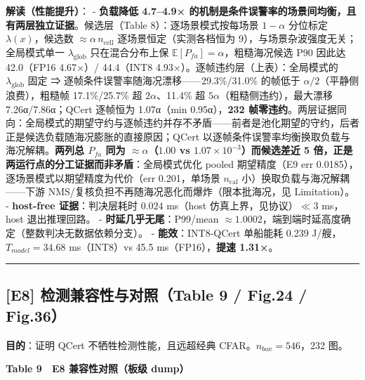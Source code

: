 \textbf{解读（性能提升）}： - \textbf{负载降低 4.7--4.9×
的机制是条件误警率的场景间均衡，且有两层独立证据}。候选层（Table
8）：逐场景模式按每场景 \(1-\alpha\) 分位标定 \(\lambda(x)\)，候选数
\(\approx\alpha\,n_{\mathrm{cell}}\) 逐场景恒定（实测各档恒为
9），与场景杂波强度无关；全局模式单一 \(\lambda_{\mathrm{glob}}\)
只在混合分布上保 \(\mathbb{E}[P_{fa}]=\alpha\)，粗糙海况候选 P90 因此达
42.0（FP16 4.67×）/ 44.4（INT8 4.93×）。逐帧违约层（上表）：全局模式的
\(\lambda_{\mathrm{glob}}\) 固定 ⇒
逐帧条件误警率随海况漂移------29.3\%/31.0\% 的帧低于
\(\alpha/2\)（平静侧浪费），粗糙帧 17.1\%/25.7\% 超 \(2\alpha\)、11.4\%
超 \(5\alpha\)（粗糙侧违约），最大漂移 7.26α/7.86α；QCert 逐帧恒为
1.07α（min 0.95α），\textbf{232
帧零违约}。两层证据同向：全局模式的期望守约与逐帧违约并存不矛盾------前者是池化期望的守约，后者正是候选负载随海况膨胀的直接原因；QCert
以逐帧条件误警率均衡换取负载与海况解耦。\textbf{两列总 \(P_{fa}\) 同为
\(\approx\alpha\)（\(1.00\) vs \(1.07\times10^{-3}\)）而候选差近 5
倍，正是两运行点的分工证据而非矛盾}：全局模式优化 pooled 期望精度（E9
err 0.0185），逐场景模式以期望精度为代价（err 0.201，单场景
\(n_{\mathrm{cal}}\) 小）换取负载与海况解耦------下游
NMS/复核负担不再随海况恶化而爆炸（限本批海况，见 Limitation）。 -
\textbf{host-free 证据}：判决层耗时 \(0.024\) ms（host
仿真上界，见协议）\(\ll 3\) ms，host 退出推理回路。 -
\textbf{时延几乎无尾}：P99/mean
\(\approx1.0002\)，端到端时延高度确定（整数判决无数据依赖分支）。 -
\textbf{能效}：INT8-QCert 单船能耗 0.239 J/艘，\(T_{model}=34.68\)
ms（INT8）vs 45.5 ms（FP16），\textbf{提速 1.31×}。

\begin{center}\rule{0.5\linewidth}{0.5pt}\end{center}

\subsection{{[}E8{]} 检测兼容性与对照（Table 9 / Fig.24 /
Fig.36）}\label{e8-ux68c0ux6d4bux517cux5bb9ux6027ux4e0eux5bf9ux7167table-9-fig.24-fig.36}

\textbf{目的}：证明 QCert 不牺牲检测性能，且远超经典
CFAR。\(n_{box}=546\)，232 图。

\textbf{Table 9　E8 兼容性对照（板级 dump）}

